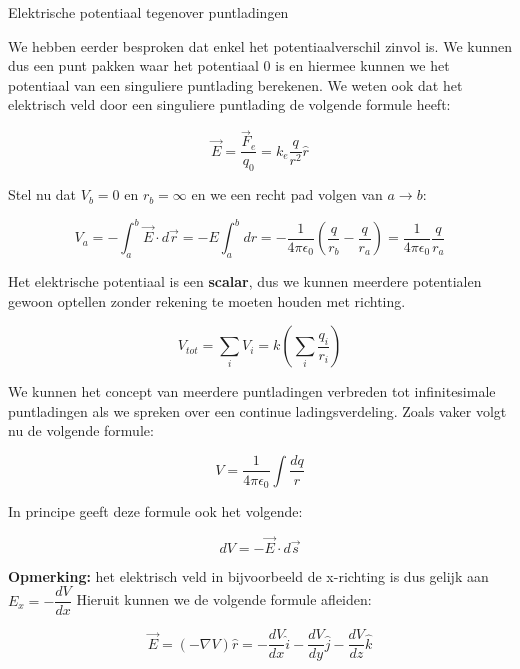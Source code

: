 \begin{app}{Elektrische potentiaal tegenover puntladingen}

    We hebben eerder besproken dat enkel het potentiaalverschil zinvol is. We kunnen dus een punt pakken waar het potentiaal 0 is en hiermee kunnen we het potentiaal van een singuliere puntlading berekenen. We weten ook dat het elektrisch veld door een singuliere puntlading de volgende formule heeft:
    
    \begin{equation*}
        \Vec{E} = \dfrac{\Vec{F}_e}{q_0}= k_e\dfrac{q}{r^2}\hat{r}
    \end{equation*}
    
    
    \noindent Stel nu dat $ V_b = 0 $ en $ r_b = \infty $ en we een recht pad volgen van $ a \to b $:
    
    \begin{equation*}
        V_a = - \int_a^b \Vec{E} \cdot d\Vec{r} = - E \int_a^{b} dr = - \dfrac{1}{4\pi\epsilon_0}(\dfrac{q}{r_b} - \dfrac{q}{r_a})  = \dfrac{1}{4\pi\epsilon_0}\dfrac{q}{r_a}
    \end{equation*}
    
    \noindent Het elektrische potentiaal is een \textbf{scalar}, dus we kunnen meerdere potentialen gewoon optellen zonder rekening te moeten houden met richting.
    
    \begin{equation*}
        V_{tot} = \sum_i V_{i}= k(\sum_i \dfrac{q_i}{r_{i}})
    \end{equation*}
    
    \noindent We kunnen het concept van meerdere puntladingen verbreden tot infinitesimale puntladingen als we spreken over een continue ladingsverdeling. Zoals vaker volgt nu de volgende formule:
    
    \begin{equation*}
        V = \dfrac{1}{4\pi\epsilon_0}\int\dfrac{dq}{r}
    \end{equation*}
    
    \noindent In principe geeft deze formule ook het volgende:
    
    \begin{equation*}
        dV = -\Vec{E} \cdot d\Vec{s}
    \end{equation*}
    
    \noindent \textbf{Opmerking:} het elektrisch veld in bijvoorbeeld de x-richting is dus gelijk aan $ E_x = -\dfrac{dV}{dx} $ Hieruit kunnen we de volgende formule afleiden:
    
    \begin{equation*}
        \Vec{E} = (-\nabla V)\hat{r} = -\dfrac{dV}{dx}\hat{i} -\dfrac{dV}{dy}\hat{j} -\dfrac{dV}{dz}\hat{k}
    \end{equation*}

\end{app}

